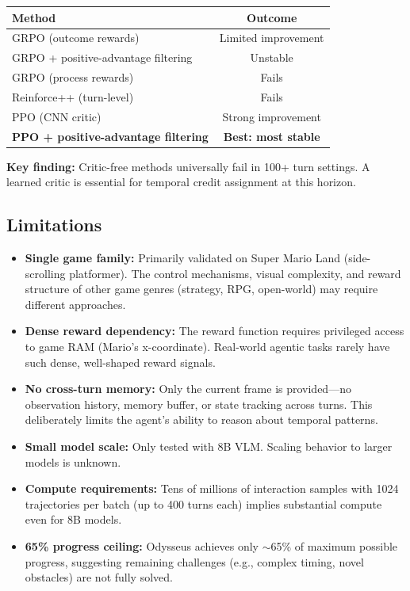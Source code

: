 \documentclass[11pt]{article}
\begin{document}
\begin{center}
\begin{tabular}{lc}
\toprule
\textbf{Method} & \textbf{Outcome} \\
\midrule
GRPO (outcome rewards) & Limited improvement \\
GRPO + positive-advantage filtering & Unstable \\
GRPO (process rewards) & Fails \\
Reinforce++ (turn-level) & Fails \\
PPO (CNN critic) & Strong improvement \\
\textbf{PPO + positive-advantage filtering} & \textbf{Best: most stable} \\
\bottomrule
\end{tabular}
\end{center}

\textbf{Key finding:} Critic-free methods universally fail in 100+ turn settings. A learned critic is essential for temporal credit assignment at this horizon.

\subsection{Limitations}

\begin{itemize}
    \item \textbf{Single game family:} Primarily validated on Super Mario Land (side-scrolling platformer). The control mechanisms, visual complexity, and reward structure of other game genres (strategy, RPG, open-world) may require different approaches.
    \item \textbf{Dense reward dependency:} The reward function requires privileged access to game RAM (Mario's x-coordinate). Real-world agentic tasks rarely have such dense, well-shaped reward signals.
    \item \textbf{No cross-turn memory:} Only the current frame is provided---no observation history, memory buffer, or state tracking across turns. This deliberately limits the agent's ability to reason about temporal patterns.
    \item \textbf{Small model scale:} Only tested with 8B VLM. Scaling behavior to larger models is unknown.
    \item \textbf{Compute requirements:} Tens of millions of interaction samples with 1024 trajectories per batch (up to 400 turns each) implies substantial compute even for 8B models.
    \item \textbf{65\% progress ceiling:} Odysseus achieves only $\sim$65\% of maximum possible progress, suggesting remaining challenges (e.g., complex timing, novel obstacles) are not fully solved.
\end{itemize}
\end{document}
